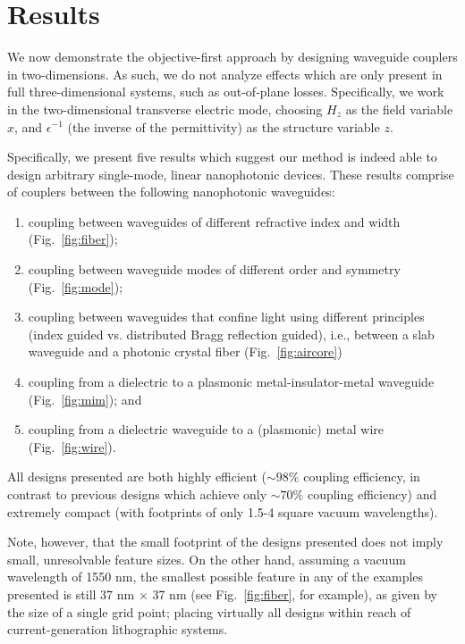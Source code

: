 \section{Results}
We now demonstrate the objective-first approach
    by designing waveguide couplers in two-dimensions.
As such, we do not analyze effects which are only present in full 
    three-dimensional systems, such as out-of-plane losses.
Specifically, we work in the two-dimensional transverse electric mode,
    choosing $H_z$ as the field variable $x$,
    and $\epsilon^{-1}$ (the inverse of the permittivity) 
    as the structure variable $z$.

Specifically, we present five results which suggest our method
    is indeed able to design arbitrary single-mode, linear nanophotonic devices\cite{Lu12}.
These results comprise of couplers between 
    the following nanophotonic waveguides:
    \begin{enumerate}
    \item coupling between waveguides of different refractive index and width
        (Fig.~\ref{fig:fiber});
    \item coupling between waveguide modes of different order and symmetry
        (Fig.~\ref{fig:mode});
    \item coupling between waveguides that confine light 
        using different principles 
        (index guided vs. distributed Bragg reflection guided), 
        i.e., between a slab waveguide and a photonic crystal fiber
        (Fig.~\ref{fig:aircore})
    \item coupling from a dielectric to a plasmonic metal-insulator-metal 
        waveguide (Fig.~\ref{fig:mim}); and
    \item coupling from a dielectric waveguide to a (plasmonic) metal wire
        (Fig.~\ref{fig:wire}).
    \end{enumerate}
All designs presented are both highly efficient 
    ($\sim 98\%$ coupling efficiency, in contrast to previous designs
    which achieve only $\sim 70\%$ coupling efficiency\cite{Veronis07,Yang10})
    and extremely compact 
    (with footprints of only 1.5-4 square vacuum wavelengths).

Note, however, that the small footprint of the designs presented does not 
    imply small, unresolvable feature sizes.
On the other hand, assuming a vacuum wavelength of 1550 nm,
    the smallest possible feature in any of the examples presented is still
    37 nm $\times$ 37 nm (see Fig.~\ref{fig:fiber}, for example),
    as given by the size of a single grid point;
    placing virtually all designs within reach of current-generation lithographic
    systems.

